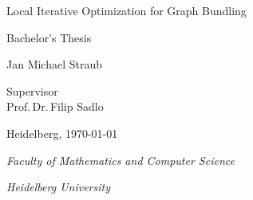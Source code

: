 
\begin{titlepage}
  \centering %
  \vspace*{\baselineskip} %


  {\huge Local Iterative Optimization for Graph Bundling}\\[0.2\baselineskip] %


  \vspace*{\baselineskip}

  {\Large Bachelor's Thesis\\[\baselineskip]} %
  \vspace*{\baselineskip}

  {\LARGE Jan Michael Straub\\[\baselineskip]} %

  \vspace*{\baselineskip} %

  Supervisor\\
  {\large  Prof.\,Dr.\,Filip Sadlo\\[\baselineskip]} %

  \vfil

  Heidelberg,  \today \par %

  \vspace*{\baselineskip}

  {\itshape Faculty of Mathematics and Computer Science\par} %
  {\itshape Heidelberg University\par} %
\end{titlepage}

\cleardoublepage
